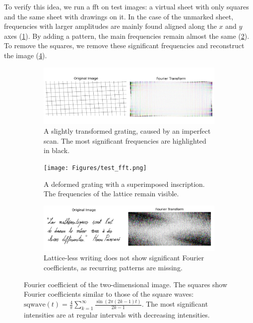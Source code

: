     \noindent To verify this idea, we run a \gls{fft} on test images: a virtual sheet with only squares and the same sheet with drawings on it. In the case of the unmarked sheet, frequencies with larger amplitudes are mainly found aligned along the $x$ and $y$ axes (\cref{fig:synthetic_grid_fft}). By adding a pattern, the main frequencies remain almost the same (\cref{fig:synthetic_sign_fft}). To remove the squares, we remove these significant frequencies and reconstruct the image (\cref{fig:synthetic_clean_fft}).

    \begin{figure}
    	\centering
    	\begin{subfigure}[t]{\linewidth}
    		\includegraphics[width=\linewidth]{Figures/grid_fft.png} \caption{A slightly transformed grating, caused by an imperfect scan. The most significant frequencies are highlighted in black.} \label{fig:synthetic_grid_fft}
    	\end{subfigure}
    	\begin{subfigure}[t]{\linewidth}
    		\texttt{[image: Figures/test\_fft.png]} \caption{A deformed grating with a superimposed inscription. The frequencies of the lattice remain visible.} \label{fig:synthetic_sign_fft}
    	\end{subfigure} \begin{subfigure}[t]{\linewidth}
    		\includegraphics[width=\linewidth]{Figures/clean_fft.png} \caption{Lattice-less writing does not show significant Fourier coefficients, as recurring patterns are missing.} \label{fig:synthetic_clean_fft}
    	\end{subfigure}
    	\caption[Synthetic FFT test]{Fourier coefficient of the two-dimensional image. The squares show Fourier coefficients similar to those of the square waves: $\text{sqwave}(t) = \frac{4}{\pi}\sum_{k=1}^{\infty}\frac{\sin\left(2\pi(2k-1)t\right)}{2k-1}$. The most significant intensities are at regular intervals with decreasing intensities.}
    \end{figure}

